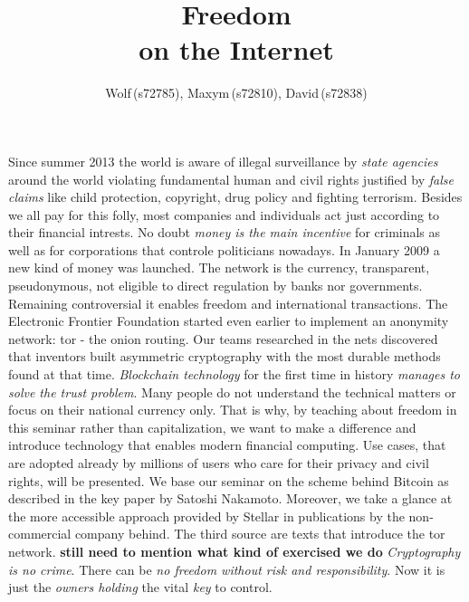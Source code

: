 \documentclass[DIV=calc, BCOR=5mm, paper=a4, fontsize=11pt, twocolumn]{scrartcl}	 %
\title{Freedom \\
on the Internet} %
\author{Wolf\,(s72785), Maxym\,(s72810), David\,(s72838) } %
\date{} %
\newcommand{\initial}[1]{ %
\lettrine[lines=3,lhang=0.3,nindent=0em]{
\color{DarkGoldenrod}
{\textsf{#1}}}{}}
\begin{document}
\maketitle %

\thispagestyle{fancy} %



\begin{onehalfspace}

\initial{S}ince summer 2013 the world is aware of illegal surveillance by \textit{state agencies} around the world violating fundamental human and civil rights justified by \textit{false claims} like child protection, copyright, drug policy and fighting terrorism.
Besides we all pay for this folly, most companies and individuals act just according to their financial intrests.
No doubt \textit{money is the main incentive} for criminals as well as for corporations that controle politicians nowadays.
In January 2009 a new kind of money was launched.
The network is the currency, transparent, pseudonymous, not eligible to direct regulation by banks nor governments. Remaining controversial it enables freedom and international transactions.
The Electronic Frontier Foundation started even earlier to implement an anonymity network: tor - the onion routing.
Our teams researched in the nets discovered that inventors built asymmetric cryptography with the most durable methods found at that time.
\textit{Blockchain technology} for the first time in history \textit{manages to solve the trust problem}.
Many people do not understand the technical matters or focus on their national currency only. That is why, by teaching about freedom in this seminar rather than capitalization, we want to make a difference and introduce technology that enables modern financial computing.
Use cases, that are adopted already by millions of users who care for their privacy and civil rights, will be presented.
We base our seminar on the scheme behind Bitcoin as described in the key paper by Satoshi Nakamoto. Moreover, we take a glance at the more accessible approach provided by Stellar in publications by the non-commercial company behind. The third source are texts that introduce the tor network.
%
\textbf{still need to mention what kind of exercised we do}
%
\textit{Cryptography is no crime}. There can be \textit{no freedom without risk and responsibility}.
Now it is just the \textit{owners holding} the vital \textit{key} to control.

\end{onehalfspace}
\end{document}
